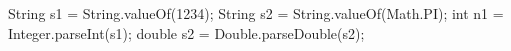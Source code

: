 \begin{verbnobox}[\small]
String s1 = String.valueOf(1234);
String s2 = String.valueOf(Math.PI);
int n1 = Integer.parseInt(s1);
double s2 = Double.parseDouble(s2);
\end{verbnobox}







